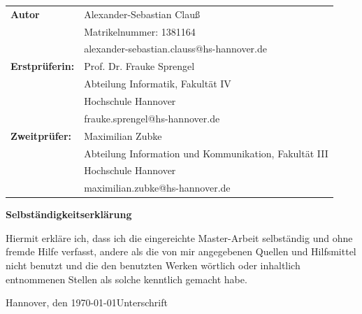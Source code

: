 \documentclass[12pt,a4paper,twoside,parskip=half-,headsepline,headinclude]{scrreprt}
\begin{document}
\newpage \thispagestyle{empty}
\begin{tabular}{ll}
{\bfseries\sffamily Autor} & Alexander-Sebastian Clauß \\ 
            			   & Matrikelnummer: 1381164 \\
            			   & alexander-sebastian.clauss@hs-hannover.de \\[5ex]
{\bfseries\sffamily Erstprüferin:} & Prof. Dr. Frauke Sprengel \\
          						   & Abteilung Informatik, Fakultät IV \\
         						   & Hochschule Hannover \\
        						   & frauke.sprengel@hs-hannover.de \\[5ex]
{\bfseries\sffamily Zweitprüfer:}  & Maximilian Zubke \\
          						   & Abteilung Information und Kommunikation, Fakultät III \\
         						   & Hochschule Hannover \\
        						   & maximilian.zubke@hs-hannover.de
\end{tabular}

\vfill

\begin{center} \sffamily\bfseries Selbständigkeitserklärung \end{center}

Hiermit erkläre ich, dass ich die eingereichte Master-Arbeit
selbständig und ohne fremde Hilfe verfasst, andere als die von mir angegebenen Quellen und Hilfsmittel nicht benutzt und die den benutzten Werken wörtlich oder
inhaltlich entnommenen Stellen als solche kenntlich gemacht habe. 
\vspace*{7ex}

Hannover, den \today \hfill Unterschrift


\tableofcontents
\listoffigures
\listoftables










\end{document}
